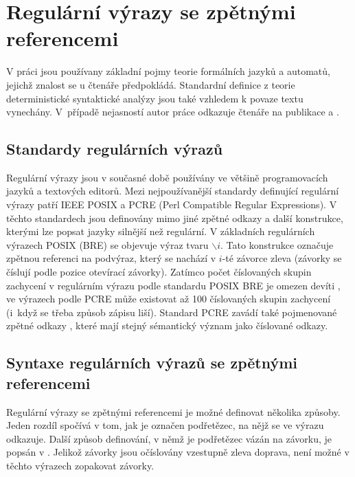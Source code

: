 \documentclass[thesis=B,czech]{FITthesis}[2019/12/23]
\theoremstyle{definition}
\begin{document}
\chapter{Regulární výrazy se zpětnými referencemi}

V práci jsou používany základní pojmy teorie formálních jazyků a automatů, jejichž znalost se u čtenáře předpokládá. Standardní definice z teorie deterministické syntaktické analýzy jsou také vzhledem k povaze textu vynechány. V~případě nejasností autor práce odkazuje čtenáře na publikace \cite{hopcroft} a \cite{aho_lam_sethi_ullman_2007}.
\section{Standardy regulárních výrazů}
Regulární výrazy jsou v současné době používány ve většině programovacích jazyků a textových editorů. Mezi nejpoužívanější standardy definující regulární výrazy patří IEEE POSIX a PCRE (Perl Compatible Regular Expressions). V těchto standardech jsou definovány mimo jiné zpětné odkazy a další konstrukce, kterými lze popsat jazyky silnější než regulární. V základních regulárních výrazech POSIX (BRE) se objevuje výraz tvaru $\backslash i$. Tato konstrukce označuje zpětnou referenci na podvýraz, který se nachází v $i$-té závorce zleva (závorky se číslují podle pozice otevírací závorky). Zatímco počet číslovaných skupin zachycení v regulárním výrazu podle standardu POSIX BRE je omezen devíti \cite[s. 233]{posix}, ve výrazech podle PCRE může existovat až 100 číslovaných skupin zachycení (i~když se třeba způsob zápisu liší). Standard PCRE zavádí také pojmenované zpětné odkazy \cite{pcre}, které mají stejný sémantický význam jako číslované odkazy.
\section{Syntaxe regulárních výrazů se zpětnými referencemi}

Regulární výrazy se zpětnými referencemi je možné definovat několika způsoby. Jeden rozdíl spočívá v tom, jak je označen podřetězec, na nějž se ve výrazu odkazuje. Další způsob definování, v němž je podřetězec vázán na závorku, je popsán v \cite{campeanu}. Jelikož závorky jsou očíslovány vzestupně zleva doprava, není možné v těchto výrazech zopakovat  závorky.
\end{document}
